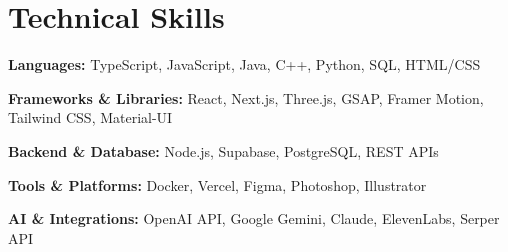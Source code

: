 \documentclass[10pt]{article}
\begin{document}
\section*{Technical Skills}
\textbf{Languages:} TypeScript, JavaScript, Java, C++, Python, SQL, HTML/CSS

\vspace{2pt}
\textbf{Frameworks \& Libraries:} React, Next.js, Three.js, GSAP, Framer Motion, Tailwind CSS, Material-UI

\vspace{2pt}
\textbf{Backend \& Database:} Node.js, Supabase, PostgreSQL, REST APIs

\vspace{2pt}
\textbf{Tools \& Platforms:} Docker, Vercel, Figma, Photoshop, Illustrator

\vspace{2pt}
\textbf{AI \& Integrations:} OpenAI API, Google Gemini, Claude, ElevenLabs, Serper API
\end{document}
